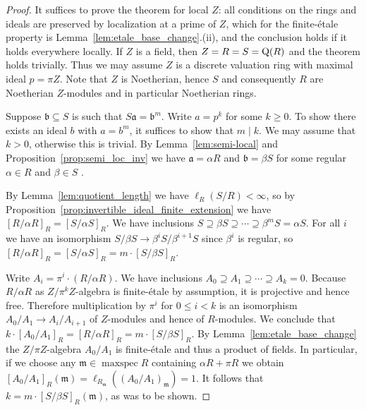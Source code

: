 \documentclass{amsart}
\theoremstyle{plain}
\theoremstyle{definition}
\DeclareMathOperator{\maxspec}{maxspec}
\newcommand{\m}{\ensuremath{\mathfrak{m}}}
\begin{document}
\begin{proof}
It suffices to prove the theorem for local \(Z\): all conditions on the rings and ideals are preserved by localization at a prime of \(Z\), which for the finite-\'etale property is Lemma~\ref{lem:etale_base_change}.(ii), and the conclusion holds if it holds everywhere locally.
If \(Z\) is a field, then \(Z=R=S=\textup{Q}(R)\) and the theorem holds trivially.
Thus we may assume \(Z\) is a discrete valuation ring with maximal ideal \(p=\pi Z\). 
Note that \(Z\) is Noetherian, hence \(S\) and consequently \(R\) are Noetherian \(Z\)-modules and in particular Noetherian rings.

Suppose \(\mathfrak{b}\subseteq S\) is such that \(S\mathfrak{a}=\mathfrak{b}^m\).
Write \(a=p^k\) for some \(k\geq 0\). To show there exists an ideal \(b\) with \(a=b^m\), it suffices to show that \(m \mid k\).
We may assume that \(k>0\), otherwise this is trivial.
By Lemma~\ref{lem:semi-local} and Proposition~\ref{prop:semi_loc_inv} we have \(\mathfrak{a}=\alpha R\) and \(\mathfrak{b}=\beta S\) for some regular \(\alpha\in R\) and \(\beta\in S\) .

By Lemma~\ref{lem:quotient_length} we have \(\ell_R(S/R)<\infty\), so by Proposition~\ref{prop:invertible_ideal_finite_extension} we have \([R/\alpha R]_R=[S/\alpha S]_R\).
We have inclusions \(S\supseteq \beta S \supseteq \dotsm \supseteq \beta^m S=\alpha S\).
For all \(i\) we have an isomorphism \(S/\beta S\to \beta^i S/\beta^{i+1}S\) since \(\beta^i\) is regular, so \([R/\alpha R]_R=[S/\alpha S]_R=m \cdot [S/\beta S]_R\).

Write \(A_i=\pi^i\cdot (R/\alpha R)\).
We have inclusions \(A_0 \supseteq A_1 \supseteq\dotsm\supseteq A_k=0\).
Because \(R/\alpha R\) as \(Z/\pi^k Z\)-algebra is finite-\'etale by assumption, it is projective and hence free.
Therefore multiplication by \(\pi^i\) for \(0\leq i < k\) is an isomorphism \(A_0/A_1\to A_{i}/A_{i+1}\) of \(Z\)-modules and hence of \(R\)-modules.
We conclude that \(k\cdot [A_0/A_1]_R = [R/\alpha R]_R = m \cdot [S/\beta S]_R\).
By Lemma~\ref{lem:etale_base_change} the \(Z/\pi Z\)-algebra \(A_0/A_1\) is finite-\'etale and thus a product of fields. 
In particular, if we choose any \(\m\in\maxspec R\) containing \(\alpha R+\pi R\) we obtain \([A_0/A_1]_R(\m)=\ell_{R_\m}((A_0/A_1)_\m)=1\).
It follows that \(k=m\cdot [S/\beta S]_R(\m)\), as was to be shown.
\end{proof}
\end{document}
